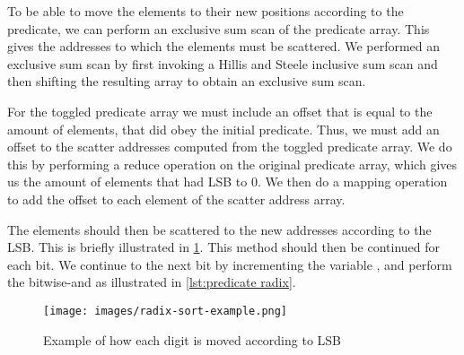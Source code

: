 To be able to move the elements to their new positions according to the predicate, we can perform an exclusive sum scan of the predicate array.
This gives the addresses to which the elements must be scattered.
We performed an exclusive sum scan by first invoking a Hillis and Steele inclusive sum scan and then shifting the resulting array to obtain an exclusive sum scan.

For the toggled predicate array we must include an offset that is equal to the amount of elements, that did obey the initial predicate.
Thus, we must add an offset to the scatter addresses computed from the toggled predicate array.
We do this by performing a reduce operation on the original predicate array, which gives us the amount of elements that had LSB to 0.
We then do a mapping operation to add the offset to each element of the scatter address array.

The elements should then be scattered to the new addresses according to the LSB.
This is briefly illustrated in \cref{fig:radix sort example}.
This method should then be continued for each bit.
We continue to the next bit by incrementing the variable , and perform the bitwise-and as illustrated in \cref{lst:predicate radix}.

\begin{figure}[htb]
  \centering
  \texttt{[image: images/radix-sort-example.png]}
  \caption{Example of how each digit is moved according to LSB}
  \label{fig:radix sort example}
\end{figure}


